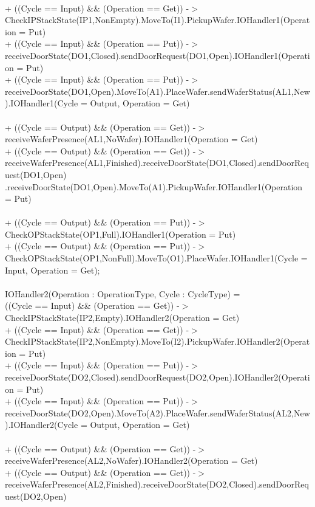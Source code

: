 \documentclass[a4paper,12pt]{article}
\begin{document}
\\+ ((Cycle == Input) \&\& (Operation == Get)) -$>$ CheckIPStackState(IP1,NonEmpty).MoveTo(I1).PickupWafer.IOHandler1(Operation = Put)
\\+ ((Cycle == Input) \&\& (Operation == Put)) -$>$ receiveDoorState(DO1,Closed).sendDoorRequest(DO1,Open).IOHandler1(Operation = Put)
\\+ ((Cycle == Input) \&\& (Operation == Put)) -$>$ receiveDoorState(DO1,Open).MoveTo(A1).PlaceWafer.sendWaferStatus(AL1,New).IOHandler1(Cycle = Output, Operation = Get)
\\
\\+ ((Cycle == Output) \&\& (Operation == Get)) -$>$ receiveWaferPresence(AL1,NoWafer).IOHandler1(Operation = Get)
\\+ ((Cycle == Output) \&\& (Operation == Get)) -$>$ receiveWaferPresence(AL1,Finished).receiveDoorState(DO1,Closed).sendDoorRequest(DO1,Open)
.receiveDoorState(DO1,Open).MoveTo(A1).PickupWafer.IOHandler1(Operation = Put)
\\
\\+ ((Cycle == Output) \&\& (Operation == Put)) -$>$ CheckOPStackState(OP1,Full).IOHandler1(Operation = Put)
\\+ ((Cycle == Output) \&\& (Operation == Put)) -$>$ CheckOPStackState(OP1,NonFull).MoveTo(O1).PlaceWafer.IOHandler1(Cycle = Input, Operation = Get);
\\
\\IOHandler2(Operation : OperationType, Cycle : CycleType) =
\\((Cycle == Input) \&\& (Operation == Get)) -$>$ CheckIPStackState(IP2,Empty).IOHandler2(Operation = Get)
\\+ ((Cycle == Input) \&\& (Operation == Get)) -$>$ CheckIPStackState(IP2,NonEmpty).MoveTo(I2).PickupWafer.IOHandler2(Operation = Put)
\\+ ((Cycle == Input) \&\& (Operation == Put)) -$>$ receiveDoorState(DO2,Closed).sendDoorRequest(DO2,Open).IOHandler2(Operation = Put)
\\+ ((Cycle == Input) \&\& (Operation == Put)) -$>$ receiveDoorState(DO2,Open).MoveTo(A2).PlaceWafer.sendWaferStatus(AL2,New).IOHandler2(Cycle = Output, Operation = Get)
\\
\\+ ((Cycle == Output) \&\& (Operation == Get)) -$>$ receiveWaferPresence(AL2,NoWafer).IOHandler2(Operation = Get)
\\+ ((Cycle == Output) \&\& (Operation == Get)) -$>$ receiveWaferPresence(AL2,Finished).receiveDoorState(DO2,Closed).sendDoorRequest(DO2,Open)
\end{document}

